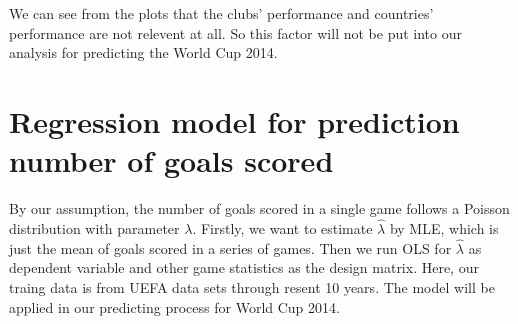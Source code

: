 \documentclass[letterpaper,10pt,english]{/usr/local/lib/python2.7/dist-packages/sphinx/texinputs/sphinxhowto}
\begin{document}
We can see from the plots that the clubs' performance and countries'
performance are not relevent at all. So this factor will not be put into
our analysis for predicting the World Cup 2014.\section{Regression model for prediction number of goals scored}By our assumption, the number of goals scored in a single game follows a
Poisson distribution with parameter $\lambda$. Firstly, we want to
estimate $\hat{\lambda}$ by MLE, which is just the mean of goals scored
in a series of games. Then we run OLS for $\hat{\lambda}$ as dependent
variable and other game statistics as the design matrix. Here, our
traing data is from UEFA data sets through resent 10 years. The model
will be applied in our predicting process for World Cup 2014.

\end{document}
